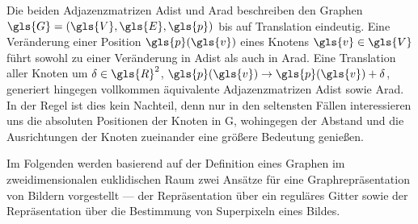 Die beiden Adjazenzmatrizen \gls{Adist} und \gls{Arad} beschreiben den Graphen $\gls{G} = \left(\gls{V}, \gls{E}, \gls{p}\right)$ bis auf Translation eindeutig.
Eine Veränderung einer Position $\gls{p}\left(\gls{v}\right)$ eines Knotens $\gls{v} \in \gls{V}$ führt sowohl zu einer Veränderung in \gls{Adist} als auch in \gls{Arad}.
Eine Translation aller Knoten um $\ve{\delta} \in \gls{R}^2$, \dhe{} $\gls{p}\left(\gls{v}\right) \rightarrow \gls{p}\left(\gls{v}\right) + \ve{\delta}$, generiert hingegen vollkommen äquivalente Adjazenzmatrizen \gls{Adist} sowie \gls{Arad}.
In der Regel ist dies kein Nachteil, denn nur in den seltensten Fällen interessieren uns die absoluten Positionen der Knoten in \gls{G}, wohingegen der Abstand und die Ausrichtungen der Knoten zueinander eine größere Bedeutung genießen.

Im Folgenden werden basierend auf der Definition eines Graphen im zweidimensionalen  euklidischen Raum zwei Ansätze für eine Graphrepräsentation von Bildern vorgestellt — der Repräsentation über ein reguläres Gitter sowie der Repräsentation über die Bestimmung von Superpixeln eines Bildes.





